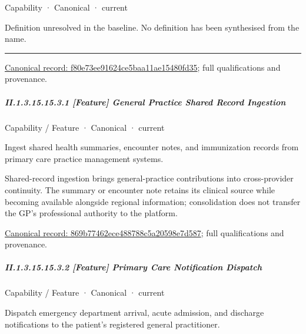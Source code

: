 \label{element:f80e73ee91624ce5baa11ae15480fd35}
{\small Capability · Canonical · current}\par

Definition unresolved in the baseline. No definition has been synthesised from the name.



\medskip\hrule\medskip

{\footnotesize \href{../../../../continuum/strategy/capability/f80e73ee91624ce5baa11ae15480fd35.md}{Canonical record: f80e73ee91624ce5baa11ae15480fd35}; full qualifications and provenance.}\par
\subparagraph*{II.1.3.15.15.3.1 [Feature] General Practice Shared Record Ingestion}
\label{navigation:II.1.3.15.15.3.1}

\label{element:869b77462ece488788c5a20598e7d587}
{\small Capability / Feature · Canonical · current}\par

Ingest shared health summaries, encounter notes, and immunization records from primary care practice management systems.



Shared-record ingestion brings general-practice contributions into cross-provider continuity. The summary or encounter note retains its clinical source while becoming available alongside regional information; consolidation does not transfer the GP's professional authority to the platform.


{\footnotesize \href{../../../../continuum/strategy/capability/feature/869b77462ece488788c5a20598e7d587.md}{Canonical record: 869b77462ece488788c5a20598e7d587}; full qualifications and provenance.}\par
\subparagraph*{II.1.3.15.15.3.2 [Feature] Primary Care Notification Dispatch}
\label{navigation:II.1.3.15.15.3.2}

\label{element:56739765fcfd4084b38d4550593ee74d}
{\small Capability / Feature · Canonical · current}\par

Dispatch emergency department arrival, acute admission, and discharge notifications to the patient's registered general practitioner.



